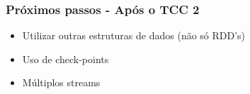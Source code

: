 \documentclass{beamer}
\begin{document}
  \begin{frame}
      \frametitle{Próximos passos - Após o TCC 2}
      \begin{itemize}
          \item Utilizar outras estruturas de dados (não só RDD's)
          \item Uso de check-points
          \item Múltiplos streams
      \end{itemize}
  \end{frame}
\end{document}
